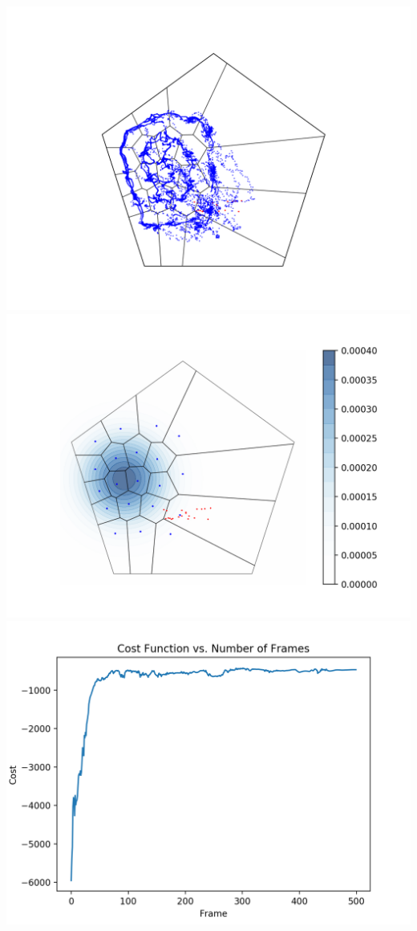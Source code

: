 \documentclass[portrait,fontscale=0.292,paperheight=48in,paperwidth=36in]{baposter}
\begin{document}
\begin{poster}
{
	\begin{center}
		\includegraphics[scale=.3]{poster_sim1_tracking}
		\includegraphics[scale=.3]{poster_sim1_final}
		\includegraphics[scale=.3]{poster_sim1_cost_}

\end{center}}
\end{poster}
\end{document}
